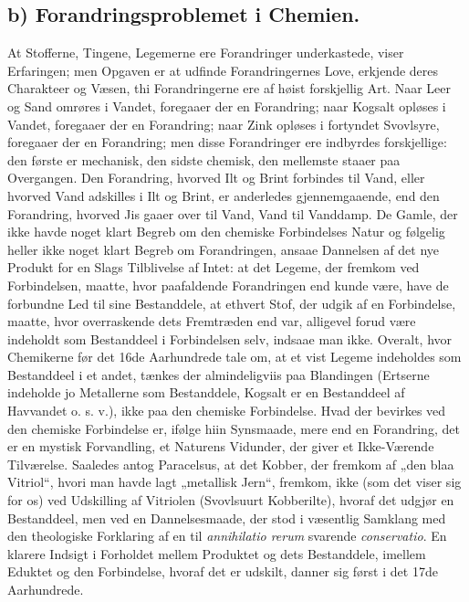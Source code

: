 \documentclass[12pt,a4paper]{book}
\begin{document}
\subsection*{b) Forandringsproblemet i Chemien.}

At Stofferne, Tingene, Legemerne ere Forandringer
underkastede, viser Erfaringen; men Opgaven er at udfinde
Forandringernes Love, erkjende deres Charakteer og Væsen,
thi Forandringerne ere af høist forskjellig Art. Naar Leer
og Sand omrøres i Vandet, foregaaer der en Forandring;
naar Kogsalt opløses i Vandet, foregaaer der en Forandring;
naar Zink opløses i fortyndet Svovlsyre, foregaaer der en
Forandring; men disse Forandringer ere indbyrdes forskjellige:
den første er mechanisk, den sidste chemisk, den mellemste staaer
paa Overgangen. Den Forandring, hvorved Ilt og Brint
forbindes til Vand, eller hvorved Vand adskilles i Ilt og
Brint, er anderledes gjennemgaaende, end den Forandring,
hvorved Jis gaaer over til Vand, Vand til Vanddamp. De
Gamle, der ikke havde noget klart Begreb om den chemiske
Forbindelses Natur og følgelig heller ikke noget klart Begreb
om Forandringen, ansaae Dannelsen af det nye Produkt
for en Slags Tilblivelse af Intet: at det Legeme, der
fremkom ved Forbindelsen, maatte, hvor paafaldende Forandringen
end kunde være, have de forbundne Led til sine
Bestanddele, at ethvert Stof, der udgik af en Forbindelse,
maatte, hvor overraskende dets Fremtræden end var, alligevel
forud være indeholdt som Bestanddeel i Forbindelsen selv,
indsaae man ikke. Overalt, hvor Chemikerne før det 16de
Aarhundrede tale om, at et vist Legeme indeholdes som Bestanddeel
i et andet, tænkes der almindeligviis paa Blandingen
(Ertserne indeholde jo Metallerne som Bestanddele,
Kogsalt er en Bestanddeel af Havvandet o. s. v.), ikke paa
den chemiske Forbindelse. Hvad der bevirkes ved den chemiske
Forbindelse er, ifølge hiin Synsmaade, mere end en Forandring,
det er en mystisk Forvandling, et Naturens Vidunder,
der giver et Ikke-Værende Tilværelse. Saaledes antog Paracelsus,
at det Kobber, der fremkom af „den blaa Vitriol“,
hvori man havde lagt „metallisk Jern“, fremkom, ikke (som
det viser sig for os) ved Udskilling af Vitriolen (Svovlsuurt
Kobberilte), hvoraf det udgjør en Bestanddeel, men ved en
Dannelsesmaade, der stod i væsentlig Samklang med den
theologiske Forklaring af en til \textit{annihilatio rerum} svarende
\textit{conservatio}. En klarere Indsigt i Forholdet mellem Produktet
og dets Bestanddele, imellem Eduktet og den Forbindelse,
hvoraf det er udskilt, danner sig først i det 17de Aarhundrede.
\end{document}
